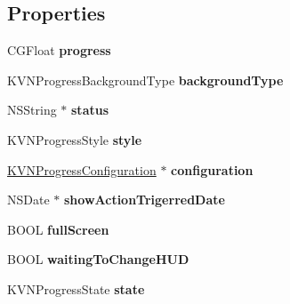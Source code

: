 \subsection*{Properties}
\begin{DoxyCompactItemize}
\item 
\mbox{\label{category_k_v_n_progress_07_08_ac5bd092ef6e9f7777a53a9dd66ca60f4}} 
C\+G\+Float {\bfseries progress}
\item 
\mbox{\label{category_k_v_n_progress_07_08_a1f1811d09963c8b86bc6aeff7878571e}} 
K\+V\+N\+Progress\+Background\+Type {\bfseries background\+Type}
\item 
\mbox{\label{category_k_v_n_progress_07_08_a39adceaf7644bbed689b5fee7b1d7065}} 
N\+S\+String $\ast$ {\bfseries status}
\item 
\mbox{\label{category_k_v_n_progress_07_08_a383d034726756294bcba6a7b22d177cf}} 
K\+V\+N\+Progress\+Style {\bfseries style}
\item 
\mbox{\label{category_k_v_n_progress_07_08_aac8c35568bee37af905f06fbbc76b0d9}} 
\mbox{\hyperlink{interface_k_v_n_progress_configuration}{K\+V\+N\+Progress\+Configuration}} $\ast$ {\bfseries configuration}
\item 
\mbox{\label{category_k_v_n_progress_07_08_a98ef93e70b2a606297070a1304ccd5b6}} 
N\+S\+Date $\ast$ {\bfseries show\+Action\+Trigerred\+Date}
\item 
\mbox{\label{category_k_v_n_progress_07_08_a672ca96cece9199babb90a2e19a7bbe9}} 
B\+O\+OL {\bfseries full\+Screen}
\item 
\mbox{\label{category_k_v_n_progress_07_08_a552425a9596e096e1ecfe764116eac38}} 
B\+O\+OL {\bfseries waiting\+To\+Change\+H\+UD}
\item 
\mbox{\label{category_k_v_n_progress_07_08_ab8e090df474f51edb8e1889dee7dde6b}} 
K\+V\+N\+Progress\+State {\bfseries state}
\item 

\end{DoxyCompactItemize}
